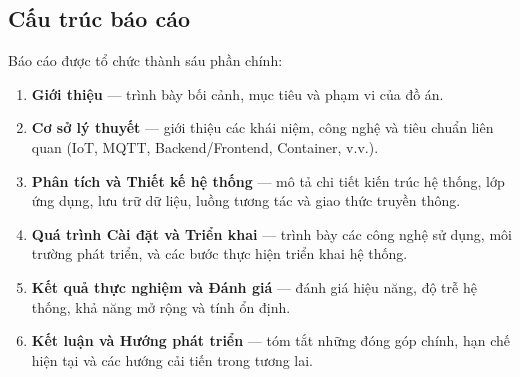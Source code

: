 \subsection*{Cấu trúc báo cáo}
Báo cáo được tổ chức thành sáu phần chính:
\begin{enumerate}
    \item \textbf{Giới thiệu} — trình bày bối cảnh, mục tiêu và phạm vi của đồ án.
    \item \textbf{Cơ sở lý thuyết} — giới thiệu các khái niệm, công nghệ và tiêu chuẩn liên quan (IoT, MQTT, Backend/Frontend, Container, v.v.).
    \item \textbf{Phân tích và Thiết kế hệ thống} — mô tả chi tiết kiến trúc hệ thống, lớp ứng dụng, lưu trữ dữ liệu, luồng tương tác và giao thức truyền thông.
    \item \textbf{Quá trình Cài đặt và Triển khai} — trình bày các công nghệ sử dụng, môi trường phát triển, và các bước thực hiện triển khai hệ thống.
    \item \textbf{Kết quả thực nghiệm và Đánh giá} — đánh giá hiệu năng, độ trễ hệ thống, khả năng mở rộng và tính ổn định.
    \item \textbf{Kết luận và Hướng phát triển} — tóm tắt những đóng góp chính, hạn chế hiện tại và các hướng cải tiến trong tương lai.
\end{enumerate}